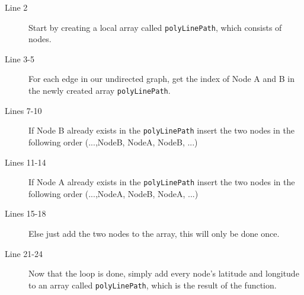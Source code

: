 \begin{description}
\item[Line 2] Start by creating a local array called  \lstinline|polyLinePath|, which consists of nodes.
\item[Line 3-5] For each edge in our undirected graph, get the index of Node A and B in the newly created array \lstinline|polyLinePath|.
\item[Lines 7-10] If Node B already exists in the \lstinline|polyLinePath| insert the two nodes in the following order (...,NodeB, NodeA, NodeB, ...)
\item[Lines 11-14] If Node A already exists in the \lstinline|polyLinePath| insert the two nodes in the following order (...,NodeA, NodeB, NodeA, ...)
\item[Lines 15-18] Else just add the two nodes to the array, this will only be done once.
\item[Line 21-24] Now that the loop is done, simply add every node's latitude and longitude to an array called \lstinline|polyLinePath|, which is the result of the function. 
\end{description}

